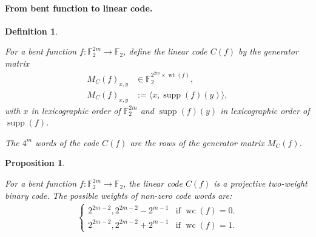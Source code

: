 \documentclass[12pt,a4paper]{article}
\newcommand{\mb}[1]{\mathbb{#1}}
\newcommand{\F}{\mb{F}}
\newcommand{\To}{\rightarrow}
\newcommand{\support}[1]{\operatorname{supp}\left(#1\right)}
\newcommand{\weight}[1]{\operatorname{wt}\left(#1\right)}
\newcommand{\weightclass}[1]{\operatorname{wc}\left(#1\right)}
\newtheorem{Proposition}{Proposition}
\newtheorem{Definition}{Definition}
\begin{document}
\paragraph*{From bent function to linear code.}
\begin{Definition}
\cite[Corollary 10]{DinD15class}

For a bent function $f : \F_2^{2m} \To \F_2$,
define the linear code $C(f)$ by the generator matrix
\begin{align*}
M_C(f)_{x,y} &\in \F_2^{2^{2m} \times \weight{f}},
\\
M_C(f)_{x,y} &:= \langle x, \support{f}(y) \rangle,
\end{align*}
with $x$ in lexicographic order of $\F_2^{2m}$
and $\support{f}(y)$ in lexicographic order of $\support{f}$.

The $4^m$ words of the code $C(f)$ are the rows of the generator matrix $M_C(f)$.
\end{Definition}

%
\begin{Proposition}
\cite[Corollary 10]{DinD15class}

For a bent function $f : \F_2^{2m} \To \F_2$, the linear code $C(f)$
is a projective two-weight binary code.
%
%
The possible weights of non-zero code words are:
\begin{align*}
\begin{cases}
2^{2m-2}, 2^{2m-2} - 2^{m-1} & \text{if~} \weightclass{f}=0.
\\
2^{2m-2}, 2^{2m-2} + 2^{m-1} & \text{if~} \weightclass{f}=1.
\end{cases}
\end{align*}
%
\end{Proposition}
%
%
\end{document}
